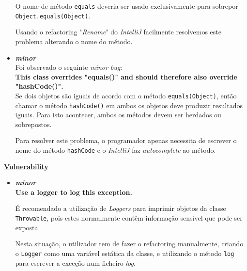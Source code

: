 \documentclass[a4paper]{report}
\begin{document}
\begin{itemize}
        O nome de método \texttt{equals} deveria ser usado exclusivamente para sobrepor \texttt{Object.equals(Object)}.
        
        Usando o refactoring "\textit{Rename}" do \textit{IntelliJ} facilmente resolvemos este problema alterando o nome do método.
        
        
    \item \textit{\textbf{minor}}\\
        Foi observado o seguinte \textit{minor bug}:\\
        \textbf{This class overrides "equals()" and should therefore also override "hashCode()".}\\
        
        Se dois objetos são iguais de acordo com o método \texttt{equals(Object)}, então chamar o método \texttt{hashCode()} em ambos os objetos deve produzir resultados iguais.
        Para isto acontecer, ambos os métodos devem ser herdados ou sobrepostos.
        
        Para resolver este problema, o programador apenas necessita de escrever o nome do método \texttt{hashCode} e o \textit{IntelliJ} faz \textit{autocomplete} ao método.
\end{itemize}

\underline{\textbf{Vulnerability}}
\begin{itemize}
    \item \textit{\textbf{minor}}\\
    \textbf{Use a logger to log this exception.}
    
    É recomendado a utilização de \textit{Loggers} para imprimir objetos da classe \texttt{Throwable}, pois estes normalmente contêm informação sensível que pode ser exposta.
    
    Nesta situação, o utilizador tem de fazer o refactoring manualmente, criando o \texttt{Logger} como uma variável estática da classe, e utilizando o método \texttt{log} para escrever a exceção num ficheiro \textit{log}.\\
\end{itemize}
\end{document}
